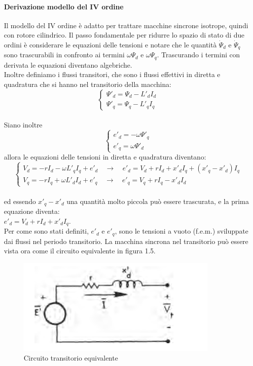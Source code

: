 \documentclass[Lau,noexaminfo]{sapthesis}
\begin{document}
	
	
	\paragraph{Derivazione modello del IV ordine}
	Il modello del IV ordine è adatto per trattare macchine sincrone isotrope, quindi con rotore cilindrico. Il passo fondamentale per ridurre lo spazio di stato di due ordini è considerare le equazioni delle tensioni e notare che le quantità $\dot{\Psi}_d$ e $\dot{\Psi}_q$ sono trascurabili in confronto ai termini $\omega\Psi_d$ e $\omega\Psi_q$.
	Trascurando i termini con derivata le equazioni diventano algebriche.\\
	Inoltre definiamo i flussi transitori, che sono i flussi effettivi in diretta e quadratura che si hanno nel transitorio della macchina:\\
	\[
	\begin{cases}
	\Psi'_d=\Psi_d-L'_dI_d\\
	\Psi'_q=\Psi_q-L'_qI_q
	\end{cases}
	\]\\
	Siano inoltre 
	\[
	\begin{cases}
	e'_d=-\omega\Psi'_q\\
	e'_q=\omega\Psi'_d
	\end{cases}
	\]
	allora le equazioni delle tensioni in diretta e quadratura diventano:\\
	\[
	\begin{cases}
	V_d=-rI_d-\omega L'_qI_q+e'_d \quad \rightarrow \quad e'_d=V_d+rI_d+x'_dI_q+(x'_q-x'_d)I_q\\
	V_q=-rI_q+\omega L'_dI_d+e'_q \quad\rightarrow \quad e'_q=V_q+rI_q-x'_dI_d
	\end{cases}
	\]\\
	ed essendo $x'_q-x'_d$ una quantità molto piccola può essere trascurata, e la prima equazione diventa:\\
	$e'_d=V_d+rI_d+x'_dI_q$.\\
	Per come sono stati definiti, $e'_d$ e $e'_q$, sono le tensioni a vuoto (f.e.m.) sviluppate dai flussi nel periodo transitorio. La macchina sincrona nel transitorio può essere vista ora come il circuito equivalente in figura 1.5.
	\begin{figure}
		\centering
		\includegraphics[height=0.1\textheight]{circuito_reattanza}
		\caption{Circuito transitorio equivalente }
	\end{figure}
\end{document}
